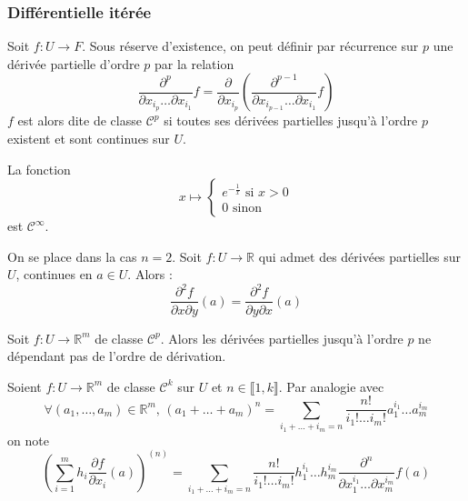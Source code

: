   \subsubsection{Différentielle itérée}

  \begin{definition}
    Soit $f : U \rightarrow F$. Sous réserve d'existence, on peut définir par récurrence sur $p$ une dérivée partielle d'ordre $p$ par la relation
    \[ \frac{\partial^p}{\partial x_{i_p} \dots \partial x_{i_1}} f = \frac{\partial}{\partial x_{i_p}} \left( \frac{\partial^{p-1}}{\partial x_{i_{p-1}} \dots \partial x_{i_1}} f \right) \]
    $f$ est alors dite de classe $\mathcal{C}^p$ si toutes ses dérivées partielles jusqu'à l'ordre $p$ existent et sont continues sur $U$.
  \end{definition}


  \begin{example}
    La fonction
    \[
    x \mapsto \begin{cases}
      e^{-\frac{1}{x}} \text{ si } x > 0 \\
      0 \text{ sinon}
    \end{cases}
    \]
    est $\mathcal{C}^\infty$.
  \end{example}


  \begin{theorem}
    On se place dans la cas $n = 2$. Soit $f : U \rightarrow \mathbb{R}$ qui admet des dérivées partielles sur $U$, continues en $a \in U$. Alors :
    \[ \frac{\partial^2 f}{\partial x \partial y}(a) = \frac{\partial^2 f}{\partial y \partial x}(a) \]
  \end{theorem}

  \begin{corollary}
    Soit $f : U \rightarrow \mathbb{R}^m$ de classe $\mathcal{C}^p$. Alors les dérivées partielles jusqu'à l'ordre $p$ ne dépendant pas de l'ordre de dérivation.
  \end{corollary}

  \begin{notation}
    Soient $f : U \rightarrow \mathbb{R}^m$ de classe $\mathcal{C}^k$ sur $U$ et $n \in \llbracket 1, k \rrbracket$. Par analogie avec
    \[ \forall (a_1, \dots, a_m) \in \mathbb{R}^m, \, (a_1 + \dots + a_m)^n = \sum_{i_1+\dots+i_m=n} \frac{n!}{i_1! \dots i_m!} a_1^{i_1} \dots a_m^{i_m} \]
    on note
    \[ \left( \sum_{i=1}^m h_i \frac{\partial f}{\partial x_i} (a) \right)^{(n)} = \sum_{i_1+\dots+i_m=n} \frac{n!}{i_1! \dots i_m!} h_1^{i_1} \dots h_m^{i_m} \frac{\partial^n}{\partial x_1^{i_1} \dots \partial x_m^{i_m}} f(a) \]
  \end{notation}

